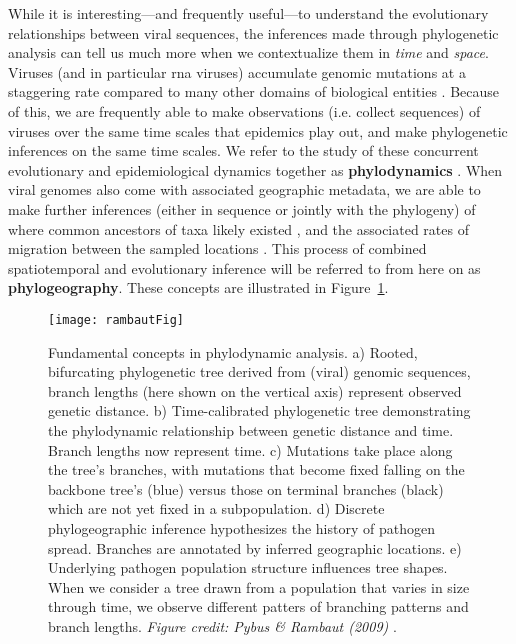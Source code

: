 While it is interesting---and frequently useful---to understand the evolutionary relationships between viral sequences, the inferences made through phylogenetic analysis can tell us much more when we contextualize them in \textit{time} and \textit{space}.
Viruses (and in particular \gls{rna} viruses) accumulate genomic mutations at a staggering rate compared to many other domains of biological entities \citep{duffy2008rates}.
Because of this, we are frequently able to make observations (i.e. collect sequences) of viruses over the same time scales that epidemics play out, and make phylogenetic inferences on the same time scales.
We refer to the study of these concurrent evolutionary and epidemiological dynamics together as \textbf{phylodynamics} \citep{volz2013viral}.
When viral genomes also come with associated geographic metadata, we are able to make further inferences (either in sequence or jointly with the phylogeny) of where common ancestors of taxa likely existed \citep{pybus2009evolutionary}, and the associated rates of migration between the sampled locations \citep{lemey2010phylogeography}.
This process of combined spatiotemporal and evolutionary inference will be referred to from here on as \textbf{phylogeography}.
These concepts are illustrated in Figure~\ref{fig:phylogeneticsOverview}.

\begin{figure}[ht]
  \centering
  \texttt{[image: rambautFig]}
  \caption[Applications of phylodynamics]{Fundamental concepts in phylodynamic analysis. a) Rooted, bifurcating phylogenetic tree derived from (viral) genomic sequences, branch lengths (here shown on the vertical axis) represent observed genetic distance. b) Time-calibrated phylogenetic tree demonstrating the phylodynamic relationship between genetic distance and time. Branch lengths now represent time. c) Mutations take place along the tree's branches, with mutations that become fixed falling on the backbone tree's (blue) versus those on terminal branches (black) which are not yet fixed in a subpopulation. d) Discrete phylogeographic inference hypothesizes the history of pathogen spread. Branches are annotated by inferred geographic locations. e) Underlying pathogen population structure influences tree shapes. When we consider a tree drawn from a population that varies in size through time, we observe different patters of branching patterns and branch lengths.
  \textit{Figure credit: Pybus \& Rambaut (2009)} \citep{pybus2009evolutionary}.
  }
  \label{fig:phylogeneticsOverview}
\end{figure}

